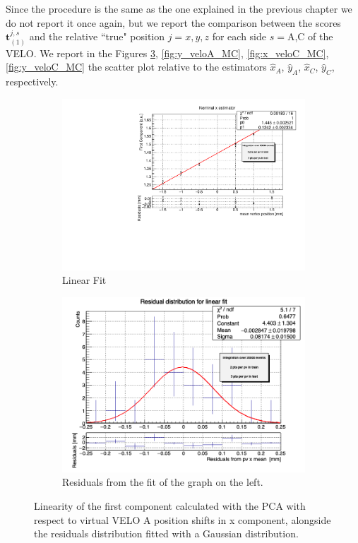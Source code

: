 Since the procedure is the same as the one explained in the previous chapter we do not report it once again, but we report the comparison between the scores $\mathbf{t}^{j,s}_{(1)}$ and the relative ``true" position $j=x,y,z$ for each side $s=$A,C of the VELO. We report in the Figures \ref{fig:x_veloA_MC}, \ref{fig:y_veloA_MC}, \ref{fig:x_veloC_MC}, \ref{fig:y_veloC_MC} the scatter plot relative to the estimators $\hat{x}_A$, $\hat{y}_A$, $\hat{x}_C$, $\hat{y}_C$, respectively.
\begin{figure}
    \centering
    \begin{subfigure}{0.48\textwidth}
    \includegraphics[width=\linewidth]{figures/x_estimate_veloA_MC.pdf}
    \caption{Linear Fit}\label{fig:x_veloA_fit_MC}
    \end{subfigure}
    \begin{subfigure}{0.48\textwidth}
    \includegraphics[width=\linewidth]{figures/x_res_veloA_MC.png}
    \caption{Residuals from the fit of the graph on the left. }\label{fig:x_veloA_res_MC}
    \end{subfigure}
    \caption{Linearity of the first component calculated with the PCA with respect to virtual VELO A position shifts in x component, alongside the residuals distribution fitted with a Gaussian distribution.}
    \label{fig:x_veloA_MC}
\end{figure}


